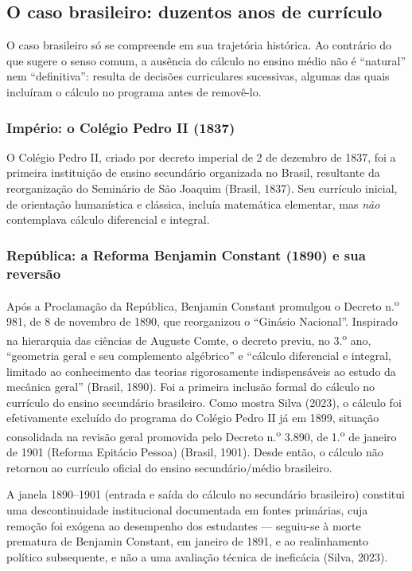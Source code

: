 \documentclass[12pt,a4paper,oneside]{article}
\begin{document}
\subsection{O caso brasileiro: duzentos anos de currículo}

O caso brasileiro só se compreende em sua trajetória histórica. Ao
contrário do que sugere o senso comum, a ausência do cálculo no ensino
médio não é ``natural'' nem ``definitiva'': resulta de decisões
curriculares sucessivas, algumas das quais incluíram o cálculo no
programa antes de removê-lo.

\subsubsection{Império: o Colégio Pedro II (1837)}

O Colégio Pedro II, criado por decreto imperial de 2 de dezembro de 1837,
foi a primeira instituição de ensino secundário organizada no Brasil,
resultante da reorganização do Seminário de São Joaquim (Brasil, 1837).
Seu currículo inicial, de orientação humanística e clássica, incluía
matemática elementar, mas \emph{não} contemplava cálculo diferencial e
integral.

\subsubsection{República: a Reforma Benjamin Constant (1890) e sua reversão}

Após a Proclamação da República, Benjamin Constant promulgou o Decreto
n.\textsuperscript{o} 981, de 8 de novembro de 1890, que reorganizou o
``Ginásio Nacional''. Inspirado na hierarquia das ciências de Auguste
Comte, o decreto previu, no 3.\textsuperscript{o} ano, ``geometria geral
e seu complemento algébrico'' e ``cálculo diferencial e integral,
limitado ao conhecimento das teorias rigorosamente indispensáveis ao
estudo da mecânica geral'' (Brasil, 1890). Foi a primeira inclusão formal
do cálculo no currículo do ensino secundário brasileiro. Como mostra
Silva (2023), o cálculo foi efetivamente excluído do programa do Colégio
Pedro II já em 1899, situação consolidada na revisão geral promovida pelo
Decreto n.\textsuperscript{o} 3.890, de 1.\textsuperscript{o} de janeiro
de 1901 (Reforma Epitácio Pessoa) (Brasil, 1901). Desde então, o cálculo
não retornou ao currículo oficial do ensino secundário/médio brasileiro.

A janela 1890--1901 (entrada e saída do cálculo no secundário brasileiro)
constitui uma descontinuidade institucional documentada em fontes
primárias, cuja remoção foi exógena ao desempenho dos estudantes ---
seguiu-se à morte prematura de Benjamin Constant, em janeiro de 1891, e
ao realinhamento político subsequente, e não a uma avaliação técnica de
ineficácia (Silva, 2023).
\end{document}
